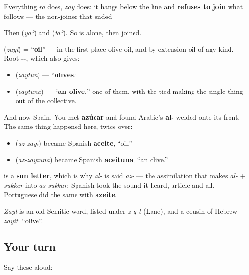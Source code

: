 Everything \emph{rā} does, \emph{zāy} does: it hangs below the line and \textbf{refuses to join} what follows — the non-joiner that ended \textbf{}.

Then \textbf{} (\emph{yāʾ}) and \textbf{} (\emph{tāʾ}). So \textbf{} is \textbf{} alone, then \textbf{} joined.

\begin{cousinweb}
\textbf{} (\emph{zayt}) = \textquotedblleft{}\textbf{oil}\textquotedblright{} — in the first place olive oil, and by extension oil of any kind. Root \textbf{--}, which also gives:

\begin{itemize}
\raggedright
  \item \textbf{} (\emph{zaytūn}) — \textquotedblleft{}\textbf{olives}.\textquotedblright{}
  \item \textbf{} (\emph{zaytūna}) — \textquotedblleft{}\textbf{an olive},\textquotedblright{} one of them, with the tied \textbf{} making the single thing out of the collective.
\end{itemize}

And now Spain. You met \textbf{azúcar} and found Arabic's \textbf{al-} welded onto its front. The same thing happened here, twice over:

\begin{itemize}
\raggedright
  \item \textbf{} (\emph{az-zayt}) became Spanish \textbf{aceite}, \textquotedblleft{}oil.\textquotedblright{}
  \item \textbf{} (\emph{az-zaytūna}) became Spanish \textbf{aceituna}, \textquotedblleft{}an olive.\textquotedblright{}
\end{itemize}

\textbf{} is a \textbf{sun letter}, which is why \emph{al-} is said \emph{az-} — the assimilation that makes \emph{al-} + \emph{sukkar} into \emph{as-sukkar}. Spanish took the sound it heard, article and all. Portuguese did the same with \textbf{azeite}.

\emph{Zayt} is an old Semitic word, listed under \emph{z-y-t} (Lane), and a cousin of Hebrew \emph{zayit}, \textquotedblleft{}olive\textquotedblright{}.
\end{cousinweb}

\subsection*{Your turn}
Say these aloud:

